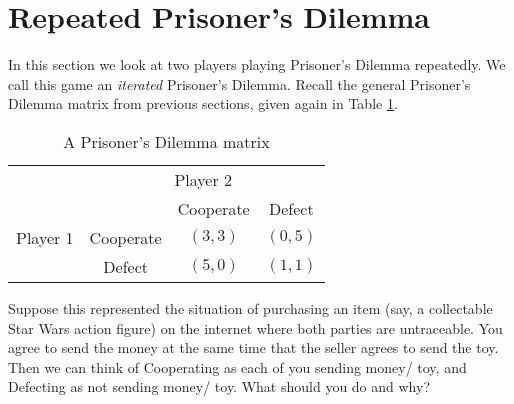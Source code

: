 
\section{Repeated Prisoner's Dilemma}




In this section we look at two players playing Prisoner's Dilemma repeatedly. We call this game an \emph{iterated} Prisoner's Dilemma.
Recall the general Prisoner's Dilemma matrix from previous sections, given again in Table \ref{T:CWPD3}.



\begin{table}[h]
\centering

\begin{tabular}{cccc}
                      & \multicolumn{3}{c}{Player 2}                                                  \\ \cline{2-4} 
\multicolumn{1}{l|}{} & \multicolumn{1}{l|}{} & \multicolumn{1}{c|}{Cooperate} & \multicolumn{1}{c|}{Defect} \\ \cline{2-4} 
\multicolumn{1}{l|}{Player 1} & \multicolumn{1}{c|}{Cooperate} & \multicolumn{1}{c|}{$(3, 3)$} & \multicolumn{1}{c|}{$(0, 5)$} \\ \cline{2-4} 
\multicolumn{1}{l|}{} & \multicolumn{1}{c|}{Defect} & \multicolumn{1}{c|}{$(5, 0)$} & \multicolumn{1}{c|}{$(1, 1)$} \\ \cline{2-4} 
\end{tabular}
\caption{A Prisoner's Dilemma matrix}
\label{T:CWPD3}
\end{table}


\begin{xca}\label{E:internetpurchaseonce}
Suppose this represented the situation of purchasing an item (say, a collectable Star Wars action figure) on the internet where both parties are untraceable. You agree to send the money at the same time that the seller agrees to send the toy. Then we can think of Cooperating as each of you sending money/ toy, and Defecting as not sending money/ toy. What should you do and why?
\end{xca}

